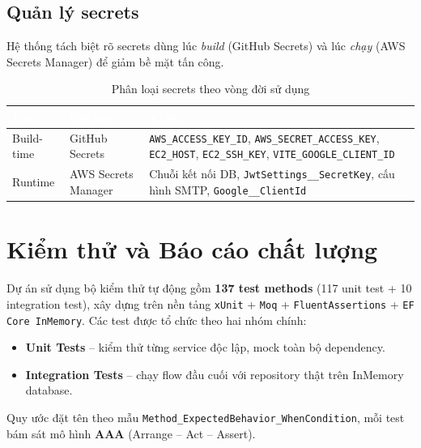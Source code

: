 \documentclass[a4paper]{article}
\begin{document}
\subsection{Quản lý secrets}

Hệ thống tách biệt rõ secrets dùng lúc \emph{build} (GitHub Secrets) và lúc
\emph{chạy} (AWS Secrets Manager) để giảm bề mặt tấn công.

\begin{table}[H]
\centering
\begin{tabular}{|L{3cm}|L{4.6cm}|L{6.4cm}|}
\hline
{}
\textcolor{white}{\textbf{Loại}} &
\textcolor{white}{\textbf{Nơi lưu}} &
\textcolor{white}{\textbf{Ví dụ}} \\
\hline
{}
Build-time &
GitHub Secrets &
\texttt{AWS\_ACCESS\_KEY\_ID}, \texttt{AWS\_SECRET\_ACCESS\_KEY},
\texttt{EC2\_HOST}, \texttt{EC2\_SSH\_KEY}, \texttt{VITE\_GOOGLE\_CLIENT\_ID} \\
\hline
Runtime &
AWS Secrets Manager &
Chuỗi kết nối DB, \texttt{JwtSettings\_\_SecretKey},
cấu hình SMTP, \texttt{Google\_\_ClientId} \\
\hline
\end{tabular}
\caption{Phân loại secrets theo vòng đời sử dụng}
\end{table}

\newpage
\section{Kiểm thử và Báo cáo chất lượng}

Dự án sử dụng bộ kiểm thử tự động gồm \textbf{137 test methods} (117 unit test + 10 integration test),
xây dựng trên nền tảng \texttt{xUnit} + \texttt{Moq} + \texttt{FluentAssertions} + \texttt{EF Core InMemory}.
Các test được tổ chức theo hai nhóm chính:
\begin{itemize}
    \item \textbf{Unit Tests} -- kiểm thử từng service độc lập, mock toàn bộ dependency.
    \item \textbf{Integration Tests} -- chạy flow đầu cuối với repository thật trên InMemory database.
\end{itemize}

Quy ước đặt tên theo mẫu \texttt{Method\_ExpectedBehavior\_WhenCondition},
mỗi test bám sát mô hình \textbf{AAA} (Arrange -- Act -- Assert).

\end{document}
